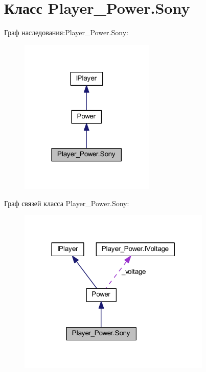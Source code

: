 \section{Класс Player\-\_\-\-Power.\-Sony}
\label{class_player___power_1_1_sony}


Граф наследования\-:Player\-\_\-\-Power.\-Sony\-:
\nopagebreak
\begin{figure}[H]
\begin{center}
\leavevmode
\includegraphics[width=182pt]{class_player___power_1_1_sony__inherit__graph}
\end{center}
\end{figure}


Граф связей класса Player\-\_\-\-Power.\-Sony\-:
\nopagebreak
\begin{figure}[H]
\begin{center}
\leavevmode
\includegraphics[width=260pt]{class_player___power_1_1_sony__coll__graph}
\end{center}
\end{figure}
